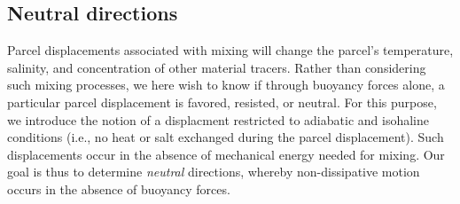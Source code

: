 \subsection{Neutral directions}
\label{subsection:neutral-directions}

Parcel displacements associated with mixing will change the parcel's
temperature, salinity, and concentration of other material
tracers. Rather than considering such mixing processes, we here wish
to know if through buoyancy forces alone, a particular parcel
displacement is favored, resisted, or neutral.  For this purpose, we
introduce the notion of a displacment restricted to adiabatic and
isohaline conditions (i.e., no heat or salt exchanged during the
parcel displacement).  Such displacements occur in the absence of
mechanical energy needed for mixing.  Our goal is thus to determine
{\it neutral} directions, whereby non-dissipative motion occurs in the
absence of buoyancy forces.

